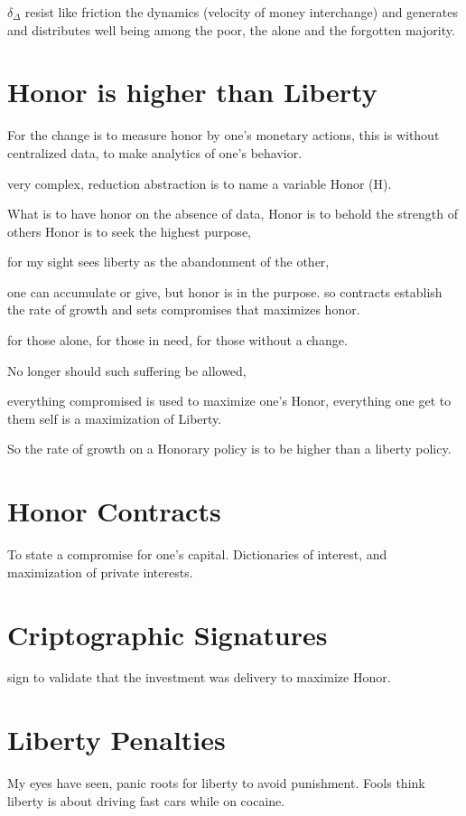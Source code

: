 \documentclass[a4paper,fleqn]{cas-sc}
\begin{document}
$\delta_{\Delta}$ resist like friction the dynamics (velocity of money interchange) and generates and distributes 
well being among the poor, the alone and the forgotten majority. 

\section{Honor is higher than Liberty}

For the change is to measure honor by one's monetary actions, 
this is without centralized data, to make analytics of one's behavior. 

very complex, reduction abstraction is to name a variable Honor (H).


What is to have honor on the absence of data, 
Honor is to behold the strength of others 
Honor is to seek the highest purpose, 

for my sight sees liberty as the abandonment of the other, 

one can accumulate or give, but honor is in the purpose. 
so contracts establish the rate of growth and sets compromises that maximizes honor. 


for those alone, 
for those in need, 
for those without a change. 

No longer should such suffering be allowed, 

everything compromised is used to maximize one's Honor, 
everything one get to them self is a maximization of Liberty. 

So the rate of growth on a Honorary policy is to be higher than a liberty policy.


\section{Honor Contracts}
To state a compromise for one's capital. 
Dictionaries of interest, and maximization of private interests. 

\section{Criptographic Signatures}
sign to validate that the investment was delivery to maximize Honor.

\section{Liberty Penalties}
My eyes have seen, panic roots for liberty to avoid punishment. 
Fools think liberty is about driving fast cars while on cocaine. 
\end{document}
